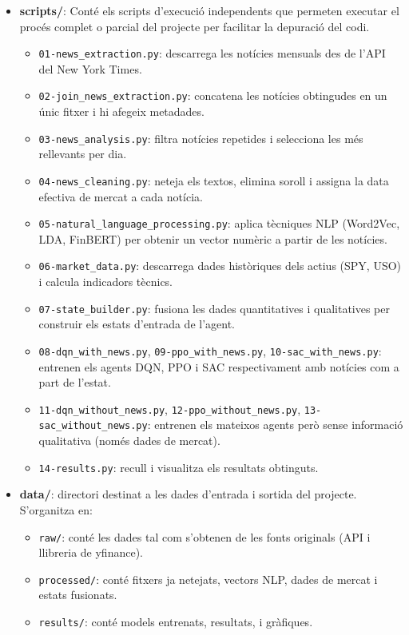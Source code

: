 \documentclass[12pt,a4paper,twoside]{book}
\begin{document}
\begin{itemize}
    \item \textbf{scripts/}: Conté els scripts d'execució independents que permeten executar el procés complet o parcial del projecte per facilitar la depuració del codi.
    \begin{itemize}
        \item \texttt{01-news\_extraction.py}: descarrega les notícies mensuals des de l'API del New York Times.
        \item \texttt{02-join\_news\_extraction.py}: concatena les notícies obtingudes en un únic fitxer i hi afegeix metadades.
        \item \texttt{03-news\_analysis.py}: filtra notícies repetides i selecciona les més rellevants per dia.
        \item \texttt{04-news\_cleaning.py}: neteja els textos, elimina soroll i assigna la data efectiva de mercat a cada notícia.
        \item \texttt{05-natural\_language\_processing.py}: aplica tècniques NLP (Word2Vec, LDA, FinBERT) per obtenir un vector numèric a partir de les notícies.
        \item \texttt{06-market\_data.py}: descarrega dades històriques dels actius (SPY, USO) i calcula indicadors tècnics.
        \item \texttt{07-state\_builder.py}: fusiona les dades quantitatives i qualitatives per construir els estats d'entrada de l'agent.
        \item \texttt{08-dqn\_with\_news.py}, \texttt{09-ppo\_with\_news.py}, \texttt{10-sac\_with\_news.py}: entrenen els agents DQN, PPO i SAC respectivament amb notícies com a part de l'estat.
        \item \texttt{11-dqn\_without\_news.py}, \texttt{12-ppo\_without\_news.py}, \texttt{13-sac\_without\_news.py}: entrenen els mateixos agents però sense informació qualitativa (només dades de mercat).
        \item \texttt{14-results.py}: recull i visualitza els resultats obtinguts.
    \end{itemize}

    \item \textbf{data/}: directori destinat a les dades d'entrada i sortida del projecte. S'organitza en:
    \begin{itemize}
        \item \texttt{raw/}: conté les dades tal com s'obtenen de les fonts originals (API i llibreria de yfinance).
        \item \texttt{processed/}: conté fitxers ja netejats, vectors NLP, dades de mercat i estats fusionats.
        \item \texttt{results/}: conté models entrenats, resultats, i gràfiques.
    \end{itemize}


\end{itemize}
\end{document}

